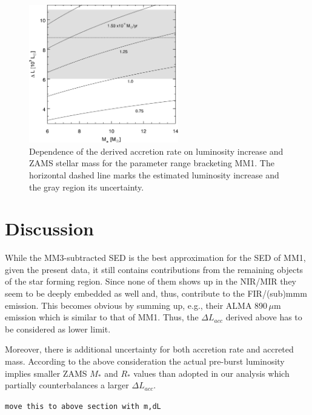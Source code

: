 \documentclass[longauth,usenatbib]{aa}
\begin{document}
\begin{figure}
    \centering
	\includegraphics[width=6.5cm]{acc.png}
	\caption{Dependence of the derived accretion rate on luminosity increase and ZAMS stellar mass for the parameter range bracketing MM1. The horizontal dashed line marks the estimated luminosity increase and the gray region its uncertainty. 
	}
 \label{fig:acc}
\end{figure}
\section{Discussion}\label{disc}

While the MM3-subtracted SED is the best approximation for the SED of MM1, given the present data, it still contains contributions from the remaining objects of the star forming region. Since none of them shows up in the NIR/MIR they seem to be deeply embedded as well and, thus, contribute to the FIR/(sub)mmm emission. This becomes obvious by summing up, e.g., their ALMA 890\,$\mu$m emission which is similar to that of MM1.
Thus, the $\Delta L_{acc}$ derived above has to be considered as lower limit.

Moreover, there is additional uncertainty for both accretion rate and accreted mass. According to the above consideration the actual pre-burst luminosity implies smaller ZAMS $M_*$ and $R_*$ values than adopted in our analysis which partially counterbalances a larger $\Delta L_{acc}$.

{\tt move this to above section with m,dL }
\end{document}
